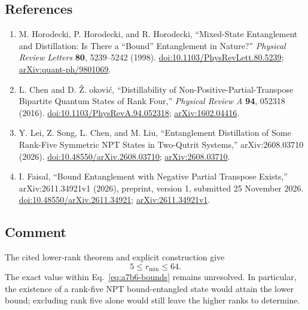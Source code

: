\subsection*{References}

\begin{enumerate}[label={},leftmargin=4.8em,labelsep=0.5em]
  \footnotesize
  \item[\textup{[HHH98]}]\label{ref:a7b6-horodecki}
  M. Horodecki, P. Horodecki, and R. Horodecki,
  ``Mixed-State Entanglement and Distillation: Is There a ``Bound''
  Entanglement in Nature?''
  \emph{Physical Review Letters} \textbf{80}, 5239--5242 (1998).
  \href{https://doi.org/10.1103/PhysRevLett.80.5239}{doi:10.1103/PhysRevLett.80.5239};
  \href{https://arxiv.org/abs/quant-ph/9801069}{arXiv:quant-ph/9801069}.

  \item[\textup{[CD16]}]\label{ref:a7b6-chen-djokovic}
  L. Chen and D. \v{Z}. \DJ okovi\'c,
  ``Distillability of Non-Positive-Partial-Transpose Bipartite Quantum States
  of Rank Four,'' \emph{Physical Review A} \textbf{94}, 052318 (2016).
  \href{https://doi.org/10.1103/PhysRevA.94.052318}{doi:10.1103/PhysRevA.94.052318};
  \href{https://arxiv.org/abs/1602.04416}{arXiv:1602.04416}.

  \item[\textup{[LSC+26]}]\label{ref:a7b6-lei-et-al}
  Y. Lei, Z. Song, L. Chen, and M. Liu,
  ``Entanglement Distillation of Some Rank-Five Symmetric NPT States in
  Two-Qutrit Systems,'' arXiv:2608.03710 (2026).
  \href{https://doi.org/10.48550/arXiv.2608.03710}{doi:10.48550/arXiv.2608.03710};
  \href{https://arxiv.org/abs/2608.03710}{arXiv:2608.03710}.

  \item[\textup{[Fai26]}]\label{ref:a7b6-faisal}
  I. Faisal,
  “Bound Entanglement with Negative Partial Transpose Exists,”
  arXiv:2611.34921v1 (2026), preprint, version 1, submitted 25 November 2026.
  \href{https://doi.org/10.48550/arXiv.2611.34921}{doi:10.48550/arXiv.2611.34921};
  \href{https://arxiv.org/abs/2611.34921v1}{arXiv:2611.34921v1}.
\end{enumerate}

\subsection*{Comment}

The cited lower-rank theorem and explicit construction give
\begin{equation}
  5\leq r_{\min}\leq64.
  \label{eq:a7b6-bounds}
\end{equation}
The exact value within Eq.~\eqref{eq:a7b6-bounds} remains unresolved.
In particular, the existence of a rank-five NPT bound-entangled state
would attain the lower bound; excluding rank five alone would still leave
the higher ranks to determine.

